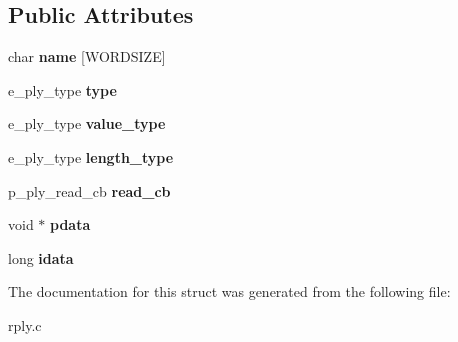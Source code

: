 \subsection*{Public Attributes}
\begin{DoxyCompactItemize}
\item 
\mbox{\label{structt__ply__property___a9093045e79e9eafa04d290b7bdc2e83b}} 
char {\bfseries name} \mbox{[}W\+O\+R\+D\+S\+I\+ZE\mbox{]}
\item 
\mbox{\label{structt__ply__property___a7021be56bf6726be847887cfbba0d24e}} 
e\+\_\+ply\+\_\+type {\bfseries type}
\item 
\mbox{\label{structt__ply__property___a3caa07217f713492cf06016c7654e87f}} 
e\+\_\+ply\+\_\+type {\bfseries value\+\_\+type}
\item 
\mbox{\label{structt__ply__property___af9b3b45ae24c1fd7d9d81a18bc3f76a7}} 
e\+\_\+ply\+\_\+type {\bfseries length\+\_\+type}
\item 
\mbox{\label{structt__ply__property___af139cc44e475f4754daf7501e1288716}} 
p\+\_\+ply\+\_\+read\+\_\+cb {\bfseries read\+\_\+cb}
\item 
\mbox{\label{structt__ply__property___af53fa1cccd547dddd25d2ea111fd3159}} 
void $\ast$ {\bfseries pdata}
\item 
\mbox{\label{structt__ply__property___a87447519f61802d3c7a4fef1024c1d03}} 
long {\bfseries idata}
\end{DoxyCompactItemize}


The documentation for this struct was generated from the following file\+:\begin{DoxyCompactItemize}
\item 
rply.\+c\end{DoxyCompactItemize}

